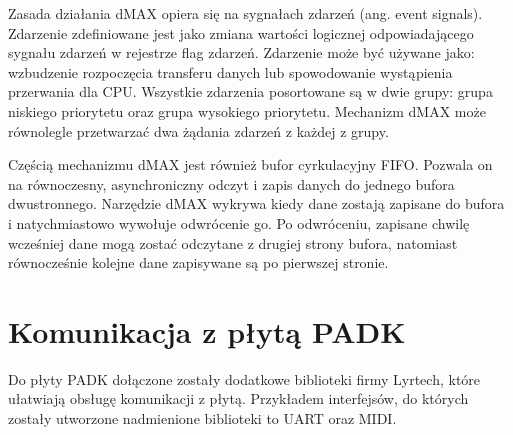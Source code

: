 Zasada działania dMAX opiera się na sygnałach zdarzeń (ang. event signals). Zdarzenie zdefiniowane jest jako zmiana wartości logicznej odpowiadającego sygnału zdarzeń w rejestrze flag zdarzeń. Zdarzenie może być używane jako: wzbudzenie rozpoczęcia transferu danych lub spowodowanie wystąpienia przerwania dla CPU. Wszystkie zdarzenia posortowane są w dwie grupy: grupa niskiego priorytetu oraz grupa wysokiego priorytetu. Mechanizm dMAX może równolegle przetwarzać dwa żądania zdarzeń z każdej z grupy.

Częścią mechanizmu dMAX jest również bufor cyrkulacyjny FIFO. Pozwala on na równoczesny, asynchroniczny odczyt i zapis danych do jednego bufora dwustronnego. Narzędzie dMAX wykrywa kiedy dane zostają zapisane do bufora i natychmiastowo wywołuje odwrócenie go. Po odwróceniu, zapisane chwilę wcześniej dane mogą zostać odczytane z drugiej strony bufora, natomiast równocześnie kolejne dane zapisywane są po pierwszej stronie.


\section{Komunikacja z płytą PADK}
Do płyty PADK dołączone zostały dodatkowe biblioteki firmy Lyrtech, które ułatwiają obsługę komunikacji z płytą. Przykładem interfejsów, do których zostały utworzone nadmienione biblioteki to UART oraz MIDI.

